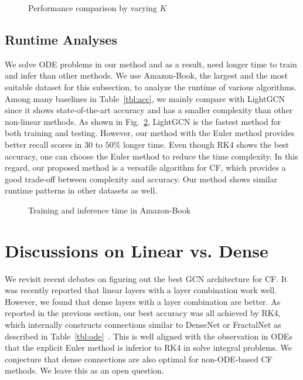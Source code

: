 \documentclass[sigconf]{acmart}
\begin{document}
\begin{figure}[t]
\centering
{}
\caption{Performance comparison by varying $K$} \label{fig:knum}
\end{figure}





\subsection{Runtime Analyses}


We solve ODE problems in our method and as a result, need longer time to train and infer than other methods. We use Amazon-Book, the largest and the most suitable dataset for this subsection, to analyze the runtime of various algorithms. Among many baselines in Table~\ref{tbl:acc}, we mainly compare with LightGCN since it shows state-of-the-art accuracy and has a smaller complexity than other non-linear methods. As shown in Fig.~\ref{fig:runtime}, LightGCN is the fastest method for both training and testing. However, our method with the Euler method provides better recall scores in $30$ to $50$\% longer time. Even though RK4 shows the best accuracy, one can choose the Euler method to reduce the time complexity. In this regard, our proposed method is a versatile algorithm for CF, which provides a good trade-off between complexity and accuracy. Our method shows similar runtime patterns in other datasets as well. 

\begin{figure}[t]
\centering
{}

\caption{Training and inference time in Amazon-Book} \label{fig:runtime}
\end{figure}

\section{Discussions on Linear vs. Dense}\label{sec:dis}
We revisit recent debates on figuring out the best GCN architecture for CF. It was recently reported that linear layers with a layer combination work well. However, we found that dense layers with a layer combination are better. As reported in the previous section, our best accuracy was all achieved by RK4, which internally constructs connections similar to DenseNet or FractalNet as described in Table~\ref{tbl:ode}~\cite{zhu2019convolutional,Larsson2017FractalNetUN,pmlr-v80-lu18d}. This is well aligned with the observation in ODEs that the explicit Euler method is inferior to RK4 in solve integral problems. We conjecture that dense connections are also optimal for non-ODE-based CF methods. We leave this as an open question.
\end{document}
